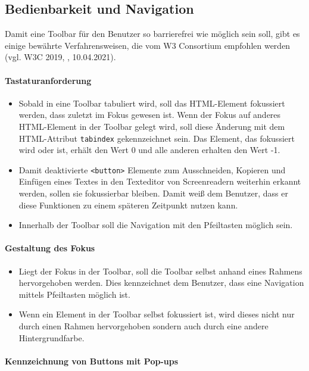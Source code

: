 \subsection{Bedienbarkeit und Navigation}
Damit eine Toolbar für den Benutzer so barrierefrei wie möglich sein soll, gibt es einige bewährte Verfahrensweisen, 
die vom W3 Consortium empfohlen werden (vgl. W3C 2019, \cite{accessible_toolbar_2020}, 10.04.2021).

\paragraph{Tastaturanforderung}

\begin{itemize}
	\item Sobald in eine Toolbar tabuliert wird, soll das HTML-Element fokussiert werden, dass zuletzt im Fokus 
		gewesen ist. Wenn der Fokus auf anderes HTML-Element in der Toolbar gelegt wird, soll diese 
		Änderung mit dem HTML-Attribut \texttt{tabindex} gekennzeichnet sein. Das Element, das fokussiert wird 	
		oder ist, erhält den Wert 0 und alle anderen erhalten den Wert -1.
	\item Damit deaktivierte \texttt{<button>} Elemente zum Ausschneiden, Kopieren und Einfügen eines Textes in 
		den Texteditor von Screenreadern weiterhin erkannt werden, sollen sie fokussierbar bleiben. Damit weiß
		dem Benutzer, dass er diese Funktionen zu einem späteren Zeitpunkt nutzen kann.
	\item Innerhalb der Toolbar soll die Navigation mit den Pfeiltasten möglich sein. 
\end{itemize}

\paragraph{Gestaltung des Fokus}

\begin{itemize}
	\item Liegt der Fokus in der Toolbar, soll die Toolbar selbst anhand eines Rahmens hervorgehoben werden. Dies
		kennzeichnet dem Benutzer, dass eine Navigation mittels Pfeiltasten möglich ist.
	\item Wenn ein Element in der Toolbar selbst fokussiert ist, wird dieses nicht nur durch einen Rahmen 	
		hervorgehoben sondern auch durch eine andere Hintergrundfarbe.
\end{itemize}

\paragraph{Kennzeichnung von Buttons mit Pop-ups}

